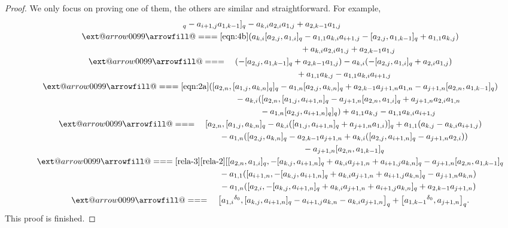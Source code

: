 \documentclass[10pt,a4paper]{amsart}
\makeatletter
\def\x@arrow{\DOTSB\Relbar}
\def\xlongequalsignfill@{\arrowfill@\x@arrow\Relbar\x@arrow}
\providecommand{\xlongequal}[2][]{%
	\ext@arrow 0099\xlongequalsignfill@{#1}{#2}}
\numberwithin{equation}{section}
\def\d{\delta}
\makeatother
\begin{document}
\begin{proof}
We only focus on proving one of them, the others are similar and straightforward. For example,
\begin{gather*}
 [a_{2,i}, [a_{k,j},a_{1,i} ]_q -a_{i+1,j}a_{1,k-1} ]_q-a_{k,i}a_{2,i}a_{1,j}+a_{2,k-1}a_{1,j}\\
\qquad \xlongequal{\eqref{eqn:4b}} (a_{k,i} [a_{2,j},a_{1,i} ]_q-a_{1,1}a_{k,i}a_{i+1,j} - [a_{2,j},a_{1,k-1} ]_q+a_{1,1}a_{k,j} ) \\
\phantom{\qquad \xlongequal{\qquad} }{}
+a_{k,i}a_{2,i}a_{1,j}+a_{2,k-1}a_{1,j}\\
\qquad \xlongequal{\quad} (- [a_{2,j},a_{1,k-1} ]_q+a_{2,k-1}a_{1,j} )
-a_{k,i} (- [a_{2,j},a_{1,i} ]_q+a_{2,i}a_{1,j} )\\
\qquad\phantom{ \xlongequal{\quad} }{}
 +a_{1,1}a_{k,j}-a_{1,1}a_{k,i}a_{i+1,j}\\
\qquad \xlongequal{\eqref{eqn:2a}} ( [a_{2,n}, [a_{1,j},a_{k,n} ]_q ]_q-a_{1,n} [a_{2,j},a_{k,n} ]_q +a_{2,k-1}a_{j+1,n}a_{1,n}-a_{j+1,n} [a_{2,n},a_{1,k-1} ]_q )\\
\phantom{\qquad \xlongequal{\qquad} }{} -a_{k,i} ( [a_{2,n}, [a_{1,j},a_{i+1,n} ]_q -a_{j+1,n} [a_{2,n},a_{1,i} ]_q +a_{j+1,n}a_{2,i}a_{1,n}\\
\phantom{\qquad \xlongequal{\qquad} }{} -a_{1,n} [a_{2,j},a_{i+1,n} ]_q ]_q )+a_{1,1}a_{k,j}-a_{1,1}a_{k,i}a_{i+1,j}\\
\qquad \xlongequal{\quad} [a_{2,n}, [a_{1,j},a_{k,n} ]_q -a_{k,i} ( [a_{1,j},a_{i+1,n} ]_q +a_{j+1,n}a_{1,i} ) ]_q +a_{1,1} (a_{k,j}-a_{k,i}a_{i+1,j} ) \\
\phantom{\qquad \xlongequal{\quad} }{} -a_{1,n} ( [a_{2,j},a_{k,n} ]_q-a_{2,k-1}a_{j+1,n} +a_{k,i} ( [a_{2,j},a_{i+1,n} ]_q-a_{j+1,n}a_{2,i} ) )\\
 \phantom{\qquad \xlongequal{\quad} }{} -a_{j+1,n} [a_{2,n},a_{1,k-1} ]_q\\
 \qquad\xlongequal[\eqref{rela-3}]{\eqref{rela-2}} [ [a_{2,n},a_{1,i} ]_q , - [a_{k,j},a_{i+1,n} ]_q+a_{k,i}a_{j+1,n}+a_{i+1,j}a_{k,n} ]_q -a_{j+1,n} [a_{2,n},a_{1,k-1} ]_q\\
\phantom{\qquad \xlongequal{\qquad} }{} -a_{1,1} ( [a_{i+1,n},- [a_{k,j},a_{i+1,n} ]_q+a_{k,i}a_{j+1,n}+a_{i+1,j}a_{k,n} ]_q -a_{j+1,n}a_{k,n} ) \\
\phantom{\qquad \xlongequal{\qquad} }{} -a_{1,n} ( [a_{2,i},- [a_{k,j},a_{i+1,n} ]_q+a_{k,i}a_{j+1,n}+a_{i+1,j}a_{k,n} ]_q +a_{2,k-1}a_{j+1,n} )\\
\qquad \xlongequal{\quad} \bigl[{a_{1,i}}^{\d_0}, [a_{k,j},a_{i+1,n} ]_q -a_{i+1,j}a_{k,n}-a_{k,i}a_{j+1,n} \bigr]_q+ \bigl[{a_{1,k-1}}^{\d_0},a_{j+1,n} \bigr]_q.
\end{gather*}
This proof is finished.
\end{proof}
\end{document}
